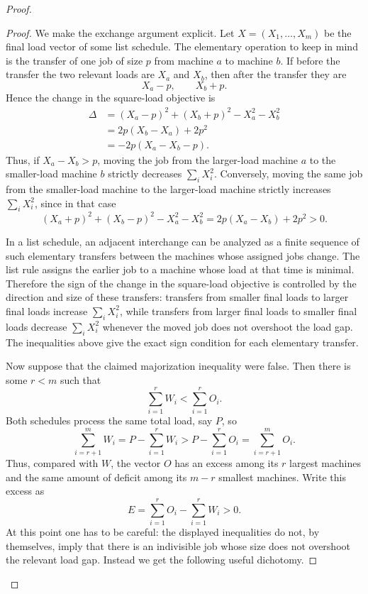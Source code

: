 \documentclass[11pt]{article}
\begin{document}
\begin{proof}
\begin{proof}
We make the exchange argument explicit. Let \(X=(X_1,\dots,X_m)\) be the
final load vector of some list schedule. The elementary operation to keep in
mind is the transfer of one job of size \(p\) from machine \(a\) to machine
\(b\). If before the transfer the two relevant loads are \(X_a\) and \(X_b\),
then after the transfer they are
\[
        X_a-p,
        \qquad
        X_b+p.
\]
Hence the change in the square-load objective is
\[
\begin{aligned}
\Delta
&=
(X_a-p)^2+(X_b+p)^2-X_a^2-X_b^2  \\
&=
2p(X_b-X_a)+2p^2  \\
&=
-2p(X_a-X_b-p).
\end{aligned}
\]
Thus, if \(X_a-X_b>p\), moving the job from the larger-load machine \(a\) to
the smaller-load machine \(b\) strictly decreases \(\sum_i X_i^2\). Conversely,
moving the same job from the smaller-load machine to the larger-load machine
strictly increases \(\sum_i X_i^2\), since in that case
\[
        (X_a+p)^2+(X_b-p)^2-X_a^2-X_b^2
        =
        2p(X_a-X_b)+2p^2
        >
        0.
\]

In a list schedule, an adjacent interchange can be analyzed as a finite sequence
of such elementary transfers between the machines whose assigned jobs change.
The list rule assigns the earlier job to a machine whose load at that time is
minimal. Therefore the sign of the change in the square-load objective is
controlled by the direction and size of these transfers: transfers from smaller
final loads to larger final loads increase \(\sum_i X_i^2\), while transfers
from larger final loads to smaller final loads decrease \(\sum_i X_i^2\)
whenever the moved job does not overshoot the load gap. The inequalities above
give the exact sign condition for each elementary transfer.

Now suppose that the claimed majorization inequality were false. Then there is
some \(r<m\) such that
\[
        \sum_{i=1}^r W_i
        <
        \sum_{i=1}^r O_i .
\]
Both schedules process the same total load, say \(P\), so
\[
        \sum_{i=r+1}^m W_i
        =
        P-\sum_{i=1}^r W_i
        >
        P-\sum_{i=1}^r O_i
        =
        \sum_{i=r+1}^m O_i .
\]
Thus, compared with \(W\), the vector \(O\) has an excess among its \(r\)
largest machines and the same amount of deficit among its \(m-r\) smallest
machines. Write this excess as
\[
        E
        =
        \sum_{i=1}^r O_i-\sum_{i=1}^r W_i
        >
        0.
\]
At this point one has to be careful: the displayed inequalities do not, by
themselves, imply that there is an indivisible job whose size does not overshoot
the relevant load gap. Instead we get the following useful dichotomy.


\end{proof}
\end{proof}
\end{document}
